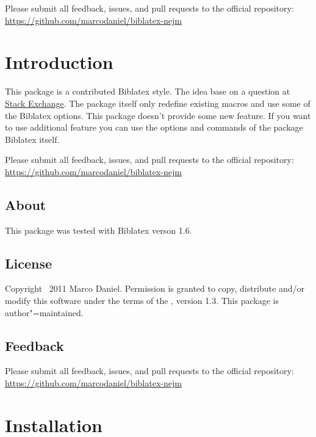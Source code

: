 \documentclass[english]{ltxdockit}[2011/03/25]
\newcommand*{\biblatex}{Biblatex\xspace}
\begin{document}
\printtitlepage

\vspace*{25px}

Please submit all feedback, issues, and pull requests to the official repository: \url{https://github.com/marcodaniel/biblatex-nejm}

\tableofcontents


\section{Introduction}
\label{int}

This package is a contributed \biblatex style. The idea base on a question at \href{http://tex.stackexchange.com/questions/26891/biblatex-style-file-for-new-england-journal-of-medicine-nejm/26894#26894}{Stack Exchange}. The package itself only redefine existing macros and use some of the \biblatex options. This package doesn't provide some new feature. If you want to use additional feature you can use the options and commands of the package \biblatex itself. 

Please submit all feedback, issues, and pull requests to the official repository: \url{https://github.com/marcodaniel/biblatex-nejm}

\subsection[About]{About }
\label{int:abt}

This package was tested with \biblatex verson 1.6.


\subsection{License}
Copyright \textcopyright\ 2011 Marco Daniel. Permission is granted to copy, distribute and\slash or modify this software under the terms of the \lppl, version 1.3. This package is author"=maintained.

\subsection{Feedback}
\label{int:feb}

Please submit all feedback, issues, and pull requests to the official repository: \url{https://github.com/marcodaniel/biblatex-nejm}

\section{Installation}
\label{inst}
\end{document}
